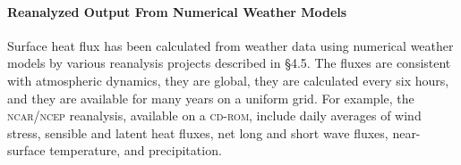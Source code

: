 \paragraph{Reanalyzed Output From Numerical Weather Models}
Surface heat flux has
been calculated from weather data using numerical weather models by
various reanalysis projects described in \S 4.5. The fluxes are
consistent with atmospheric dynamics, they are global, they are
calculated every six hours, and they are available for many years on a
uniform grid. For example, the \textsc{ncar/ncep} reanalysis,
available on a \textsc{cd-rom}, include daily averages of wind
stress, sensible and latent heat
fluxes, net long and short wave fluxes, near-surface temperature, and
precipitation.

